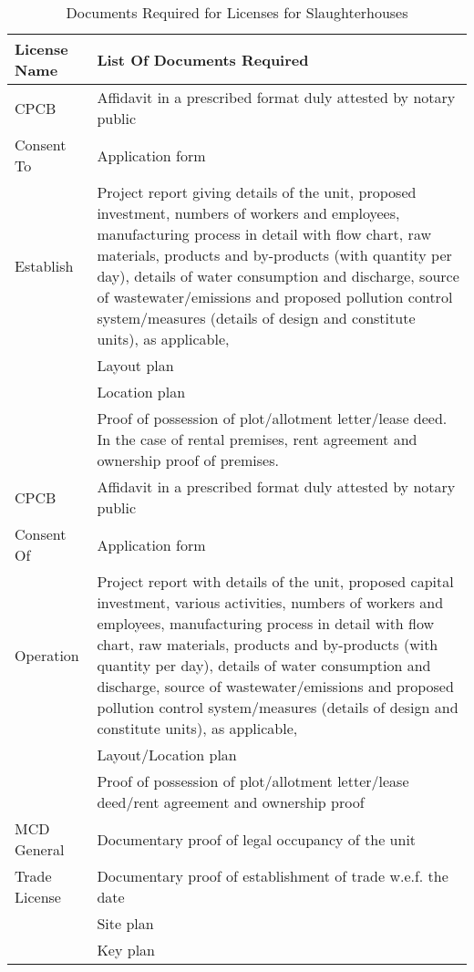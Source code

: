 \documentclass[a4paper, 12pt]{article}
\begin{document}
\begin{longtable}{>{\raggedright}p{2.5cm}>{\raggedright\arraybackslash}p{13cm}}
\caption{Documents Required for Licenses for Slaughterhouses} \\
\midrule
\endfirsthead 
   License Name & List Of Documents Required \\
    \midrule
   CPCB  & Affidavit in a prescribed format duly attested by notary public \\
   Consent  To  & Application form \\
   Establish &  Project report giving details of the unit, proposed investment, numbers of workers and employees, manufacturing process in detail with flow chart, raw materials, products and by-products (with quantity per day), details of water consumption and discharge, source of wastewater/emissions and proposed pollution control system/measures (details of design and constitute units), as applicable, \\
          & Layout plan \\
          & Location plan \\
          & Proof of possession of plot/allotment letter/lease deed. In the case of rental premises, rent agreement and ownership proof of premises. \\
    \midrule
    CPCB  & Affidavit in a prescribed format duly attested by notary public \\
    Consent Of  & Application form \\
   Operation &  Project report with details of the unit, proposed capital investment, various activities, numbers of workers and employees, manufacturing process in detail with flow chart, raw materials, products and by-products (with quantity per day), details of water consumption and discharge, source of wastewater/emissions and proposed pollution control system/measures (details of design and constitute units), as applicable, \\
          & Layout/Location plan \\
          & Proof of possession of plot/allotment letter/lease deed/rent agreement and ownership proof  \\
    \midrule
    MCD General & Documentary proof of legal occupancy of the unit \\
    Trade License & Documentary proof of establishment of trade w.e.f. the date \\
    & Site plan \\
    & Key plan \\

\end{longtable}
\end{document}
